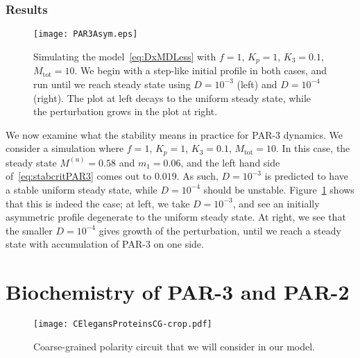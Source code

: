 \documentclass[11pt]{article}
\newcommand{\6}[1]{#1_{\text{6}}}
\newcommand{\3}[1]{#1_{\text{3}}}
\begin{document}
\subsubsection{Results}
\begin{figure}
\centering
\texttt{[image: PAR3Asym.eps]}
\caption{\label{fig:PAR3Asym}Simulating the model\ \eqref{eq:DxMDLess} with $f=1$, $K_p=1$, $\3{K}=0.1$, $M_\text{tot}=10$. We begin with a step-like initial profile in both cases, and run until we reach steady state using $D=10^{-3}$ (left) and $D=10^{-4}$ (right). The plot at left decays to the uniform steady state, while the perturbation grows in the plot at right.}
\end{figure}

We now examine what the stability means in practice for PAR-3 dynamics. We consider a simulation where $f=1$, $K_p=1$, $\3{K}=0.1$, $M_\text{tot}=10$. In this case, the steady state $M^{(u)}=0.58$ and $m_1 = 0.06$, and the left hand side of\ \eqref{eq:stabcritPAR3} comes out to $0.019$. As such, $D=10^{-3}$ is predicted to have a stable uniform steady state, while $D=10^{-4}$ should be unstable. Figure\ \ref{fig:PAR3Asym} shows that this is indeed the case; at left, we take $D=10^{-3}$, and see an initially asymmetric profile degenerate to the uniform steady state. At right, we see that the smaller $D=10^{-4}$ gives growth of the perturbation, until we reach a steady state with accumulation of PAR-3 on one side. 
\fi

\section{Biochemistry of PAR-3 and PAR-2 \label{sec:Biochem}}
\iffalse
\begin{figure}
\centering
\texttt{[image: CElegansProteinsCG-crop.pdf]}
\caption{\label{fig:ProtCircCG}Coarse-grained polarity circuit that we will consider in our model.}
\end{figure}
\end{document}
